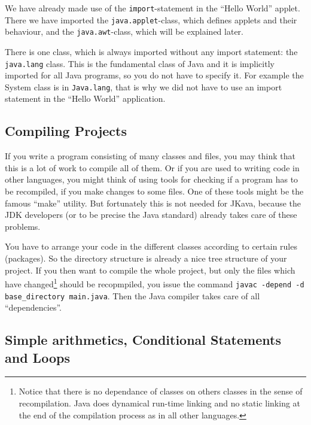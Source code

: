 We have already made use of the \verb|import|-statement in the ``Hello World'' 
applet. There we have imported the \verb|java.applet|-class, which
defines applets and their behaviour, and the \verb|java.awt|-class, which
will be explained later.
 
There is one class, which is always imported without any import statement:
the \verb|java.lang| class. This is the fundamental class of Java and it is
implicitly imported for all Java programs, so you do not have to specify
it. For example the System class is in \verb|Java.lang|, that is why
we did not have to use an import statement in the ``Hello World''
application.  


\subsection{Compiling Projects}
If you write a program consisting of many classes and files, you
may think that this is a lot of work to compile all of them. Or if
you are used to writing code in other languages, you might think
of using tools for checking if a program has to be recompiled, if you make
changes to some files. One of these tools might be the famous ``make''
utility. But fortunately this is not needed for JKava, because
the JDK developers (or to be precise the Java standard) already
takes care of these problems. 

You have to arrange your code in the different classes according to 
certain rules (packages). So the directory structure is already a
nice tree structure of your project. If you then want to compile
the whole project, but only the files which have changed\footnote{Notice
that there is no dependance of classes on others classes in the
sense of recompilation. Java does dynamical run-time linking and no static 
linking at the end of the compilation process as in all other languages.}
should be recopmpiled, you issue the
command \verb|javac -depend -d base_directory main.java|. Then
the Java compiler takes care of all ``dependencies''.   

\subsection{Simple arithmetics, Conditional Statements and Loops}
\label{sec:Loops}

